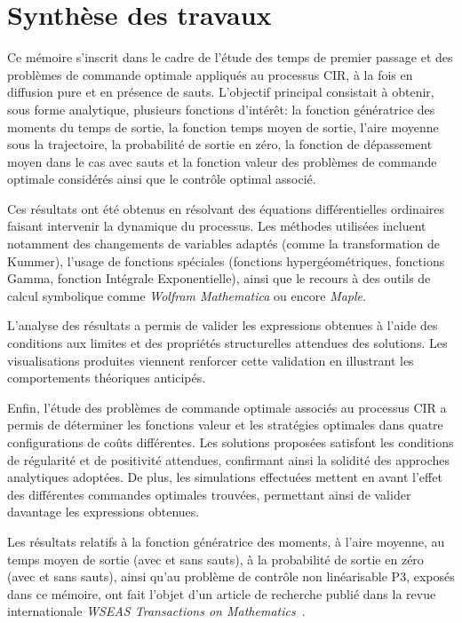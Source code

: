 \label{sec:Conclusion}
\section{Synthèse des travaux}

Ce mémoire s'inscrit dans le cadre de l'étude des temps de premier passage et des problèmes de commande optimale appliqués au processus \acs{CIR}, à la fois en diffusion pure et en présence de sauts. L'objectif principal consistait à obtenir, sous forme analytique, plusieurs fonctions d'intérêt: la fonction génératrice des moments du temps de sortie, la fonction temps moyen de sortie, l'aire moyenne sous la trajectoire, la probabilité de sortie en zéro, la fonction de dépassement moyen dans le cas avec sauts et la fonction valeur des problèmes de commande optimale considérés ainsi que le contrôle optimal associé.

Ces résultats ont été obtenus en résolvant des équations différentielles ordinaires faisant intervenir la dynamique du processus. Les méthodes utilisées incluent notamment des changements de variables adaptés (comme la transformation de Kummer), l'usage de fonctions spéciales (fonctions hypergéométriques, fonctions Gamma, fonction Intégrale Exponentielle), ainsi que le recours à des outils de calcul symbolique comme \textit{Wolfram Mathematica} ou encore \textit{Maple}.

L'analyse des résultats a permis de valider les expressions obtenues à l'aide des conditions aux limites et des propriétés structurelles attendues des solutions. Les visualisations produites viennent renforcer cette validation en illustrant les comportements théoriques anticipés.

Enfin, l'étude des problèmes de commande optimale associés au processus \acs{CIR} a permis de déterminer les fonctions valeur et les stratégies optimales dans quatre configurations de coûts différentes. Les solutions proposées satisfont les conditions de régularité et de positivité attendues, confirmant ainsi la solidité des approches analytiques adoptées. De plus, les simulations effectuées mettent en avant l'effet des différentes commandes optimales trouvées, permettant ainsi de valider davantage les expressions obtenues.

Les résultats relatifs à la fonction génératrice des moments, à l'aire moyenne, au temps moyen de sortie (avec et sans sauts), à la probabilité de sortie en zéro (avec et sans sauts), ainsi qu'au problème de contrôle non linéarisable P3, exposés dans ce mémoire, ont fait l'objet d'un article de recherche publié dans la revue internationale \textit{WSEAS Transactions on Mathematics}~\cite{lefebvre2025}.

